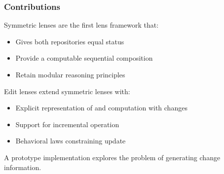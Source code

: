 \documentclass[table]{beamer}
\begin{document}
\begin{frame}
    \frametitle{Contributions}
    Symmetric lenses are the first lens framework that:
    \begin{itemize}
        \item Gives both repositories equal status
        \item Provide a computable sequential composition
        \item Retain modular reasoning principles
    \end{itemize}
    Edit lenses extend symmetric lenses with:
    \begin{itemize}
        \item Explicit representation of and computation with changes
        \item Support for incremental operation
        \item Behavioral laws constraining update
    \end{itemize}

    \vpause

    A prototype implementation explores the problem of generating change
    information.
\end{frame}
\end{document}
